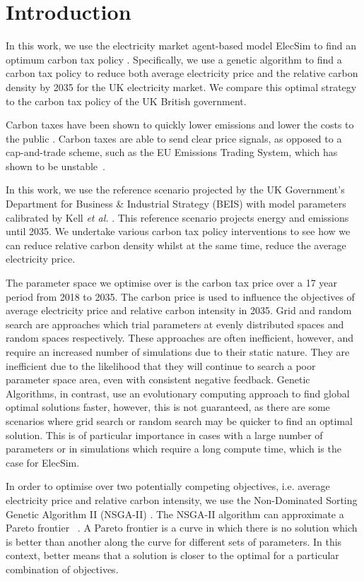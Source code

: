 \section{Introduction}
\label{carbonoptim:sec:intro}


In this work, we use the electricity market agent-based model ElecSim to find an optimum carbon tax policy \cite{Kell}. Specifically, we use a genetic algorithm to find a carbon tax policy to reduce both average electricity price and the relative carbon density by 2035 for the UK electricity market. We compare this optimal strategy to the carbon tax policy of the UK British government.

Carbon taxes have been shown to quickly lower emissions and lower the costs to the public \cite{Wittneben2009}. Carbon taxes are able to send clear price signals, as opposed to a cap-and-trade scheme, such as the EU Emissions Trading System, which has shown to be unstable~\cite{Wittneben2009}.

In this work, we use the reference scenario projected by the UK Government's Department for Business \& Industrial Strategy (BEIS) with model parameters calibrated by Kell \textit{et al.} \cite{DBEIS2019,Kell2020}. This reference scenario projects energy and emissions until 2035. We undertake various carbon tax policy interventions to see how we can reduce relative carbon density whilst at the same time, reduce the average electricity price.


The parameter space we optimise over is the carbon tax price over a 17 year period from 2018 to 2035. The carbon price is used to influence the objectives of average electricity price and relative carbon intensity in 2035. Grid and random search are approaches which trial parameters at evenly distributed spaces and random spaces respectively. These approaches are often inefficient, however, and require an increased number of simulations due to their static nature. They are inefficient due to the likelihood that they will continue to search a poor parameter space area, even with consistent negative feedback. Genetic Algorithms, in contrast, use an evolutionary computing approach to find global optimal solutions faster, however, this is not guaranteed, as there are some scenarios where grid search or random search may be quicker to find an optimal solution. This is of particular importance in cases with a large number of parameters or in simulations which require a long compute time, which is the case for ElecSim.

In order to optimise over two potentially competing objectives, i.e. average electricity price and relative carbon intensity, we use the Non-Dominated Sorting Genetic Algorithm II (NSGA-II) \cite{Valkanas2014}. The NSGA-II algorithm can approximate a Pareto frontier ~\cite{Pareto1927, Stadler1979}. A Pareto frontier is a curve in which there is no solution which is better than another along the curve for different sets of parameters. In this context, better means that a solution is closer to the optimal for a particular combination of objectives.

